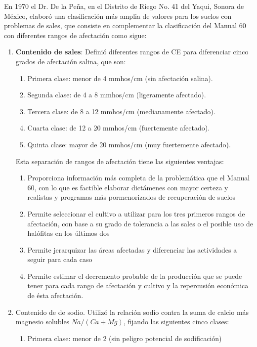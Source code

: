 En 1970 el Dr. De la Peña, en el Distrito de Riego No. 41 del Yaqui, Sonora de
México, elaboró una clasificación más amplia de valores para los suelos con
problemas de sales, que consiste en complementar la clasificación del Manual 60
con diferentes rangos de afectación como sigue:
\begin{enumerate}
    \item \textbf{Contenido de sales}: Definió diferentes rangos de CE para diferenciar cinco grados de afectación salina, que son:
    \begin{enumerate}
        \item Primera clase: menor de 4 mmhos/cm (sin afectación salina).
        \item Segunda clase: de 4 a 8 mmhos/cm (ligeramente afectado).
        \item Tercera clase: de 8 a 12 mmhos/cm (medianamente afectado).
        \item Cuarta clase: de 12 a 20 mmhos/cm (fuertemente afectado).
        \item Quinta clase: mayor de 20 mmhos/cm (muy fuertemente afectado).    
    \end{enumerate}
    Esta separación de rangos de afectación tiene las siguientes ventajas:
\begin{enumerate}
    \item Proporciona información más completa de la problemática que el Manual 60, con lo que es factible elaborar dictámenes con mayor certeza y realistas y programas más pormenorizados de recuperación de suelos
    \item Permite seleccionar el cultivo a utilizar para los tres primeros rangos de afectación, con base a su grado de tolerancia a las sales o el posible uso de halófitas en los últimos dos
    \item Permite jerarquizar las áreas afectadas y diferenciar las actividades a seguir para cada caso
    \item Permite estimar el decremento probable de la producción que se puede tener para cada rango de afectación y cultivo y la repercusión económica de ésta afectación.    
\end{enumerate}
    \item Contenido de de sodio. Utilizó la relación sodio contra la suma de calcio más magnesio solubles $Na / (Ca + Mg)$, fijando las siguientes cinco clases:
    \begin{enumerate}
        \item Primera clase: menor de 2 (sin peligro potencial de sodificación)

\end{enumerate}
\end{enumerate}
